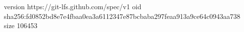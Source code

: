 version https://git-lfs.github.com/spec/v1
oid sha256:fd0852bd8e7e4fbaa0ea3a6112347e87bcbaba297feaa913a9ce64c0943aa738
size 106453
